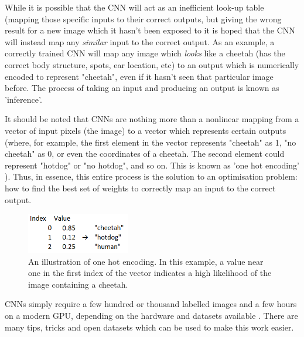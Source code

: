 While it is possible that the CNN will act as an inefficient look-up table (mapping those specific inputs to their correct outputs, but giving the wrong result for a new image which it hasn't been exposed to \cite{werbos1974beyond} it is hoped that the CNN will instead map any \emph{similar} input to the correct output. As an example, a correctly trained CNN will map any image which \emph{looks} like a cheetah (has the correct body structure, spots, ear location, etc) to an output which is numerically encoded to represent "cheetah", even if it hasn't seen that particular image before. The process of taking an input and producing an output is known as 'inference'.

It should be noted that CNNs are nothing more than a nonlinear mapping from a vector of input pixels (the image) to a vector which represents certain outputs (where, for example, the first element in the vector represents "cheetah" as 1, "no cheetah" as 0, or even the coordinates of a cheetah. The second element could represent "hotdog" or "no hotdog", and so on. This is known as 'one hot encoding' \cite{website:one_hot_encoding}). Thus, in essence, this entire process is the solution to an optimisation problem: how to find the best set of weights to correctly map an input to the correct output.

\begin{figure}[h!]
  \centering
  \includegraphics[width=0.4\textwidth]{literature_review/one_hot_encoding}
  \caption{\label{fig:one_hot_encoding}An illustration of one hot encoding. In this example, a value near one in the first index of the vector indicates a high likelihood of the image containing a cheetah.}
\end{figure}



CNNs simply require a few hundred or thousand labelled images and a few hours on a modern GPU, depending on the hardware and datasets available \cite{website:fastai_train_times}. There are many tips, tricks and open datasets which can be used to make this work easier.

